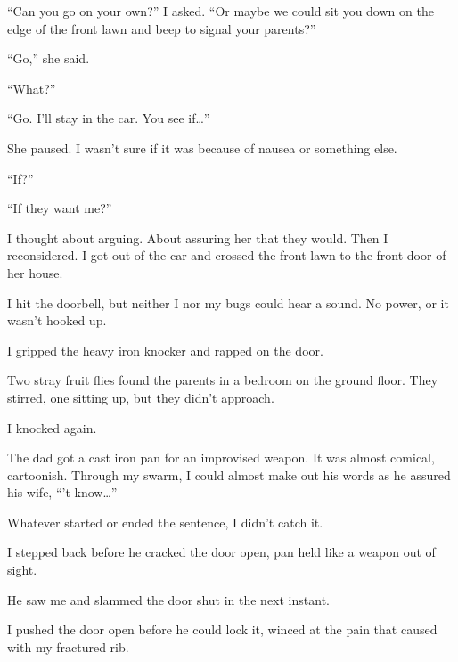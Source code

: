 ``Can you go on your own?'' I asked.  ``Or maybe we could sit you down on the edge of the front lawn and beep to signal your parents?''



``Go,'' she said.



``What?''



``Go.  I'll stay in the car.  You see if\ldots''



She paused.  I wasn't sure if it was because of nausea or something else.



``If?''



``If they want me?''



I thought about arguing.  About assuring her that they would.  Then I reconsidered.  I got out of the car and crossed the front lawn to the front door of her house.



I hit the doorbell, but neither I nor my bugs could hear a sound.  No power, or it wasn't hooked up.



I gripped the heavy iron knocker and rapped on the door.



Two stray fruit flies found the parents in a bedroom on the ground floor.  They stirred, one sitting up, but they didn't approach.



I knocked again.



The dad got a cast iron pan for an improvised weapon.  It was almost comical, cartoonish.  Through my swarm, I could almost make out his words as he assured his wife,  ``\ldotsdon't know\ldots''



Whatever started or ended the sentence, I didn't catch it.



I stepped back before he cracked the door open, pan held like a weapon out of sight.



He saw me and slammed the door shut in the next instant.



I pushed the door open before he could lock it, winced at the pain that caused with my fractured rib.



